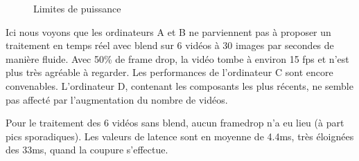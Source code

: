 \begin{figure}[H]%
    \centering
    \qquad
    \label{fig:videoCD}%
    \caption{Limites de puissance}
\end{figure}


Ici nous voyons que les ordinateurs A et B ne parviennent pas à
proposer un traitement en temps réel avec blend sur 6 vidéos à 30
images par secondes de manière fluide. Avec 50\% de frame drop,
la vidéo tombe à environ 15 fps et n'est plus très agréable à
regarder. Les performances de l'ordinateur C sont encore
convenables. L'ordinateur D, contenant les composants les plus
récents, ne semble pas affecté par l'augmentation du nombre de
vidéos.
\bigskip

Pour le traitement des 6 vidéos sans blend, aucun framedrop n'a
eu lieu (à part pics sporadiques).  Les valeurs de latence sont
en moyenne de 4.4ms, très éloignées des 33ms, quand la coupure
s'effectue.
\bigskip

